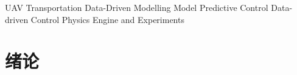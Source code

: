 \documentclass[lang=chs, degree=master, blindreview=false, winfonts=true]{yanputhesis}
\begin{document}
\begin{engabstract}
   
    \begin{engkeywords}                                     %
        UAV Transportation \ensep Data-Driven Modelling \ensep Model Predictive Control \ensep Data-driven Control \ensep Physics Engine and Experiments         %
    \end{engkeywords}                                       %
\end{engabstract}                                           %
\tableofcontents                                            %
\mainmatter
\sDefault

\chapter{绪论}
\end{document}
